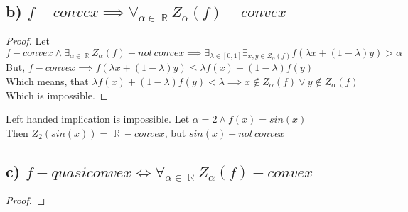 \documentclass[12pt]{article}
\DeclareMathOperator{\R}{\mathbb{R}}
\begin{document}
\subsection*{b) \( f- convex \implies \forall_{\alpha \in \R} Z_\alpha(f) -convex\)}
\begin{proof}
    Let \(f-convex \land \exists_{\alpha \in \R} Z_\alpha(f) - not\,convex \implies \exists_{\lambda \in [0,1]} \exists_{x, y \in Z_\alpha(f)}  f( \lambda x +(1-\lambda)y) > \alpha\)\\
    But, \( f- convex \implies f(\lambda x +(1-\lambda)y) \leq \lambda f(x)+(1-\lambda)f(y)\)\\
    Which means, that \(\lambda f(x)+(1-\lambda)f(y)<\lambda \implies x \notin Z_\alpha (f) \lor y \notin Z_\alpha (f)\)\\
    Which is impossible.
\end{proof}
Left handed implication is impossible.
Let \( \alpha = 2 \land f(x)=sin(x) \)\\
Then \( Z_2 (sin(x)) = \R - convex\), but \( sin(x) - not\,convex\)
\subsection*{c) \( f- quasiconvex \iff \forall_{\alpha \in \R} Z_\alpha(f) -convex\)}
\begin{proof}
    
\end{proof}
\end{document}
